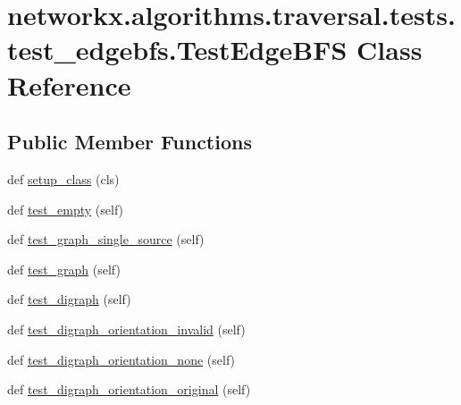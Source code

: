 \hypertarget{classnetworkx_1_1algorithms_1_1traversal_1_1tests_1_1test__edgebfs_1_1TestEdgeBFS}{}\section{networkx.\+algorithms.\+traversal.\+tests.\+test\+\_\+edgebfs.\+Test\+Edge\+B\+FS Class Reference}
\label{classnetworkx_1_1algorithms_1_1traversal_1_1tests_1_1test__edgebfs_1_1TestEdgeBFS}
\subsection*{Public Member Functions}
\begin{DoxyCompactItemize}
\item 
def \hyperlink{classnetworkx_1_1algorithms_1_1traversal_1_1tests_1_1test__edgebfs_1_1TestEdgeBFS_a8d23e6539cdfe0d571161323872b2658}{setup\+\_\+class} (cls)
\item 
def \hyperlink{classnetworkx_1_1algorithms_1_1traversal_1_1tests_1_1test__edgebfs_1_1TestEdgeBFS_a2f7af96d042a5d1b19a188c70f7927da}{test\+\_\+empty} (self)
\item 
def \hyperlink{classnetworkx_1_1algorithms_1_1traversal_1_1tests_1_1test__edgebfs_1_1TestEdgeBFS_adee769e20f94d2cac140002da16a566d}{test\+\_\+graph\+\_\+single\+\_\+source} (self)
\item 
def \hyperlink{classnetworkx_1_1algorithms_1_1traversal_1_1tests_1_1test__edgebfs_1_1TestEdgeBFS_a514527269199cdd30fa0adcdf7154ffa}{test\+\_\+graph} (self)
\item 
def \hyperlink{classnetworkx_1_1algorithms_1_1traversal_1_1tests_1_1test__edgebfs_1_1TestEdgeBFS_acf8cb4765cd83399e649d1cfcbc3fde3}{test\+\_\+digraph} (self)
\item 
def \hyperlink{classnetworkx_1_1algorithms_1_1traversal_1_1tests_1_1test__edgebfs_1_1TestEdgeBFS_a5d5d26076a19f583a6aa039de5cf0437}{test\+\_\+digraph\+\_\+orientation\+\_\+invalid} (self)
\item 
def \hyperlink{classnetworkx_1_1algorithms_1_1traversal_1_1tests_1_1test__edgebfs_1_1TestEdgeBFS_af40e2e4014ade753fef2826c0d9f00f4}{test\+\_\+digraph\+\_\+orientation\+\_\+none} (self)
\item 
def \hyperlink{classnetworkx_1_1algorithms_1_1traversal_1_1tests_1_1test__edgebfs_1_1TestEdgeBFS_a2733a09bff349c4ad55cd5dd2b7e847f}{test\+\_\+digraph\+\_\+orientation\+\_\+original} (self)

\end{DoxyCompactItemize}
